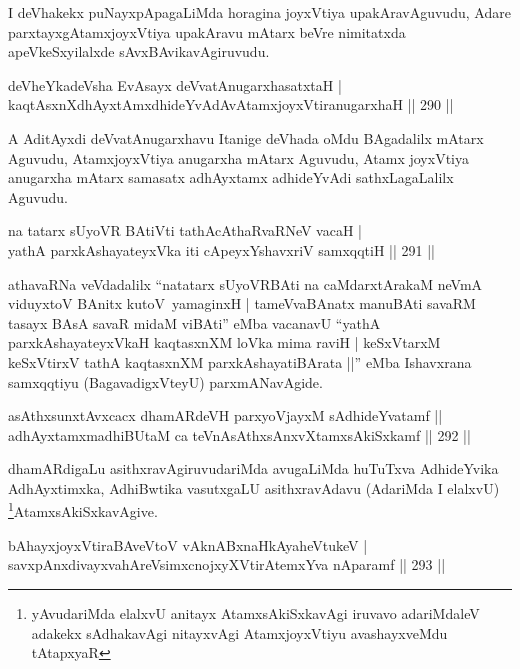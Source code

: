 \begin{artha}
I deVhakekx puNayxpApagaLiMda horagina joyxVtiya upakAravAguvudu, Adare parxtayxgAtamxjoyxVtiya upakAravu mAtarx beVre nimitatxda apeVkeSxyilalxde sAvxBAvikavAgiruvudu.
\end{artha}

\begin{shl}
deVheYkadeVsha EvAsayx deVvatAnugarxhasatxtaH | \\
kaqtAsxnXdhAyxtAmxdhideYvAdAvAtamxjoyxVtiranugarxhaH \hfill ||  290 ||  
\end{shl}

\begin{artha}
A AditAyxdi deVvatAnugarxhavu Itanige deVhada oMdu BAgadalilx mAtarx Aguvudu, AtamxjoyxVtiya anugarxha mAtarx Aguvudu, Atamx joyxVtiya anugarxha mAtarx samasatx adhAyxtamx adhideYvAdi sathxLagaLalilx Aguvudu.
\end{artha}

\begin{shl}
na tatarx sUyoVR BAtiVti tathAcA\s \s thaRvaRNeV vacaH | \\
yathA parxkAshayateyxVka iti cApeyxYshavxriV samxqqtiH \hfill ||  291 ||  
\end{shl}

\begin{artha}
athavaRNa veVdadalilx ``natatarx sUyoVRBAti na caMdarxtArakaM neVmA viduyxtoV BAnitx kutoV\ yamaginxH | tameVvaBAnatx manuBAti savaRM tasayx BAsA savaR midaM viBAti'' eMba vacanavU ``yathA parxkAshayateyxVkaH kaqtasxnXM loVka mima raviH | keSxVtarxM keSxVtirxV tathA kaqtasxnXM parxkAshayatiBArata ||'' eMba Ishavxrana samxqqtiyu (BagavadigxVteyU) parxmANavAgide.
\end{artha}

\begin{shl}
asAthxsunxtAvxcacx dhamARdeVH parxyoVjayxM sAdhideYvatamf ||  \\
adhAyxtamxmadhiBUtaM ca teVnAsAthxsAnxvXtamxsAkiSxkamf \hfill ||  292 ||  
\end{shl}

\begin{artha}
dhamARdigaLu asithxravAgiruvudariMda avugaLiMda huTuTxva AdhideYvika AdhAyxtimxka, AdhiBwtika vasutxgaLU asithxravAdavu (AdariMda I elalxvU) \footnote{yAvudariMda elalxvU anitayx AtamxsAkiSxkavAgi iruvavo adariMdaleV adakekx sAdhakavAgi nitayxvAgi AtamxjoyxVtiyu avashayxveMdu tAtapxyaR}AtamxsAkiSxkavAgive.
\end{artha}

\begin{shl}
bAhayxjoyxVtiraBAveV\s toV vAknABxnaHkAyaheVtukeV | \\
savxpAnxdivayxvahAreV\s simxcnojxyXVtirAtemxYva nAparamf \hfill ||  293 ||  
\end{shl}


